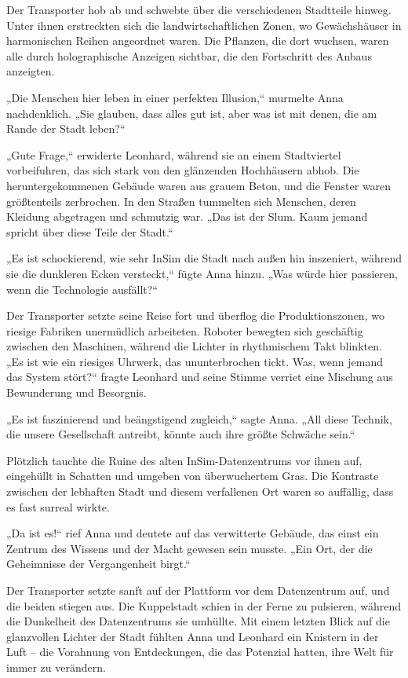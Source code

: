 \documentclass[
]{article}
\begin{document}
Der Transporter hob ab und schwebte über die verschiedenen Stadtteile
hinweg. Unter ihnen erstreckten sich die landwirtschaftlichen Zonen, wo
Gewächshäuser in harmonischen Reihen angeordnet waren. Die Pflanzen, die
dort wuchsen, waren alle durch holographische Anzeigen sichtbar, die den
Fortschritt des Anbaus anzeigten.

„Die Menschen hier leben in einer perfekten Illusion,`` murmelte Anna
nachdenklich. „Sie glauben, dass alles gut ist, aber was ist mit denen,
die am Rande der Stadt leben?{\kern0pt}``

„Gute Frage,`` erwiderte Leonhard, während sie an einem Stadtviertel
vorbeifuhren, das sich stark von den glänzenden Hochhäusern abhob. Die
heruntergekommenen Gebäude waren aus grauem Beton, und die Fenster waren
größtenteils zerbrochen. In den Straßen tummelten sich Menschen, deren
Kleidung abgetragen und schmutzig war. „Das ist der Slum. Kaum jemand
spricht über diese Teile der Stadt.``

„Es ist schockierend, wie sehr InSim die Stadt nach außen hin
inszeniert, während sie die dunkleren Ecken versteckt,`` fügte Anna
hinzu. „Was würde hier passieren, wenn die Technologie
ausfällt?{\kern0pt}``

Der Transporter setzte seine Reise fort und überflog die
Produktionszonen, wo riesige Fabriken unermüdlich arbeiteten. Roboter
bewegten sich geschäftig zwischen den Maschinen, während die Lichter in
rhythmischem Takt blinkten. „Es ist wie ein riesiges Uhrwerk, das
ununterbrochen tickt. Was, wenn jemand das System stört?{\kern0pt}``
fragte Leonhard und seine Stimme verriet eine Mischung aus Bewunderung
und Besorgnis.

„Es ist faszinierend und beängstigend zugleich,`` sagte Anna. „All diese
Technik, die unsere Gesellschaft antreibt, könnte auch ihre größte
Schwäche sein.``

Plötzlich tauchte die Ruine des alten InSim-Datenzentrums vor ihnen auf,
eingehüllt in Schatten und umgeben von überwuchertem Gras. Die Kontraste
zwischen der lebhaften Stadt und diesem verfallenen Ort waren so
auffällig, dass es fast surreal wirkte.

„Da ist es!{\kern0pt}`` rief Anna und deutete auf das verwitterte
Gebäude, das einst ein Zentrum des Wissens und der Macht gewesen sein
musste. „Ein Ort, der die Geheimnisse der Vergangenheit birgt.``

Der Transporter setzte sanft auf der Plattform vor dem Datenzentrum auf,
und die beiden stiegen aus. Die Kuppelstadt schien in der Ferne zu
pulsieren, während die Dunkelheit des Datenzentrums sie umhüllte. Mit
einem letzten Blick auf die glanzvollen Lichter der Stadt fühlten Anna
und Leonhard ein Knistern in der Luft -- die Vorahnung von Entdeckungen,
die das Potenzial hatten, ihre Welt für immer zu verändern.
\end{document}
